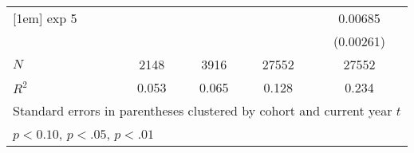 \begin{table}[ht]
{\begin{tabular}{l*{4}{c}}
[1em]
exp 5       &                     &                     &                     &     0.00685\sym{***}\\
            &                     &                     &                     &   (0.00261)         \\
\hline
\(N\)       &        2148         &        3916         &       27552         &       27552         \\
\(R^{2}\)   &       0.053         &       0.065         &       0.128         &       0.234         \\
\hline\hline
\multicolumn{5}{l}{\footnotesize Standard errors in parentheses clustered by cohort and current year $t$}\\
\multicolumn{5}{l}{\footnotesize \sym{*} \(p<0.10\), \sym{**} \(p<.05\), \sym{***} \(p<.01\)}\\
\end{tabular}%
}
\end{table}